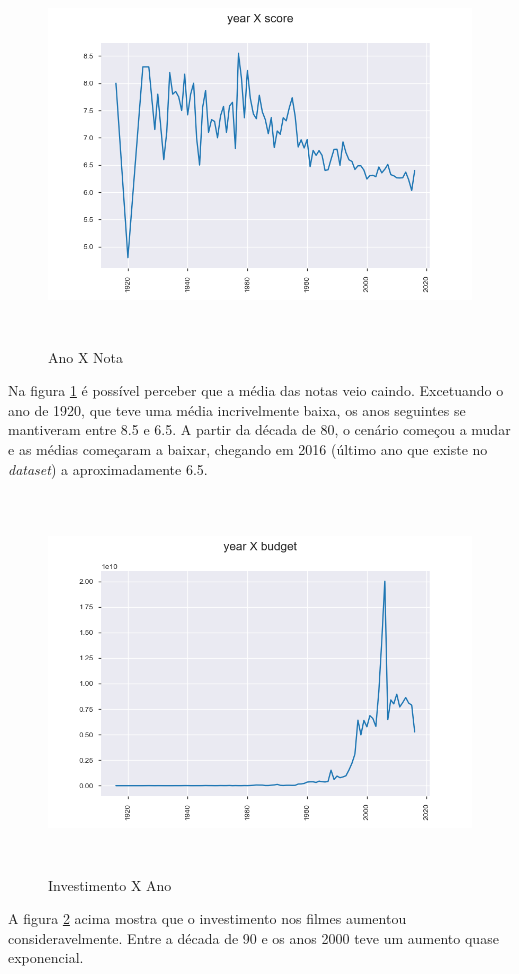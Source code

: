 \begin{figure}[H]
\centering
\includegraphics[height=10cm]{imagens/yearXscore.png}
\caption{Ano X Nota}
\label{yearXscore}
\end{figure}

Na figura \ref{yearXscore} é possível perceber que a média das notas veio caindo. Excetuando o ano de 1920, que teve uma média incrivelmente baixa, os anos seguintes se mantiveram entre 8.5 e 6.5. A partir da década de 80, o cenário começou a mudar e as médias começaram a baixar, chegando em 2016 (último ano que existe no \textit{dataset}) a aproximadamente 6.5.

\begin{figure}[H]
\centering
\includegraphics[height=10cm]{imagens/yearXbudget.png}
\caption{Investimento X Ano}
\label{budgetXyear}
\end{figure}
A figura \ref{budgetXyear} acima mostra que o investimento nos filmes aumentou consideravelmente. Entre a década de 90 e os anos 2000 teve um aumento quase exponencial.

